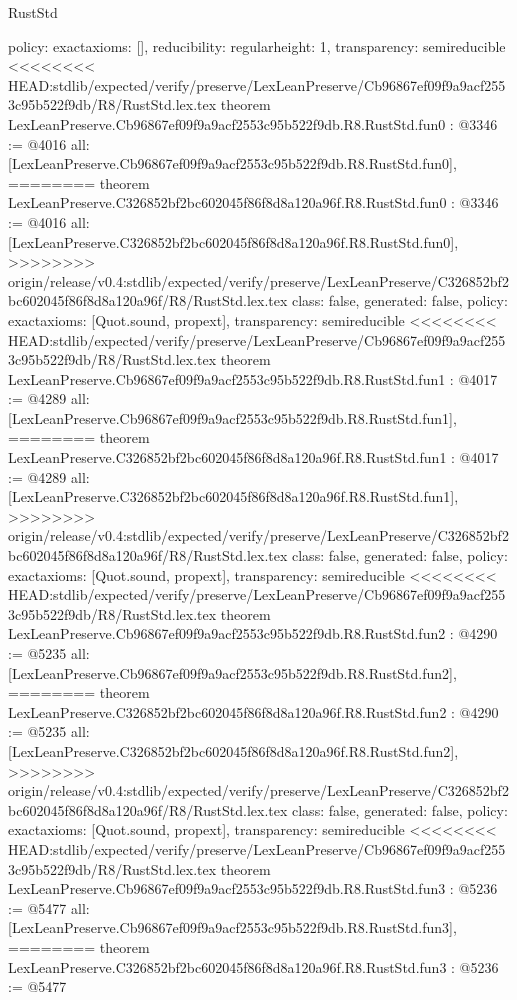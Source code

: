 \begin{lexlean}{RustStd}
\begin{coremodule}
{\begin{coremodule}
{{{  policy: exact{axioms: []},
  reducibility: regular{height: 1},
  transparency: semireducible
}
<<<<<<<< HEAD:stdlib/expected/verify/preserve/LexLeanPreserve/Cb96867ef09f9a9acf2553c95b522f9db/R8/RustStd.lex.tex
theorem LexLeanPreserve.Cb96867ef09f9a9acf2553c95b522f9db.R8.RustStd.fun0 : @3346 := @4016 {
  all: [LexLeanPreserve.Cb96867ef09f9a9acf2553c95b522f9db.R8.RustStd.fun0],
========
theorem LexLeanPreserve.C326852bf2bc602045f86f8d8a120a96f.R8.RustStd.fun0 : @3346 := @4016 {
  all: [LexLeanPreserve.C326852bf2bc602045f86f8d8a120a96f.R8.RustStd.fun0],
>>>>>>>> origin/release/v0.4:stdlib/expected/verify/preserve/LexLeanPreserve/C326852bf2bc602045f86f8d8a120a96f/R8/RustStd.lex.tex
  class: false,
  generated: false,
  policy: exact{axioms: [Quot.sound, propext]},
  transparency: semireducible
}
<<<<<<<< HEAD:stdlib/expected/verify/preserve/LexLeanPreserve/Cb96867ef09f9a9acf2553c95b522f9db/R8/RustStd.lex.tex
theorem LexLeanPreserve.Cb96867ef09f9a9acf2553c95b522f9db.R8.RustStd.fun1 : @4017 := @4289 {
  all: [LexLeanPreserve.Cb96867ef09f9a9acf2553c95b522f9db.R8.RustStd.fun1],
========
theorem LexLeanPreserve.C326852bf2bc602045f86f8d8a120a96f.R8.RustStd.fun1 : @4017 := @4289 {
  all: [LexLeanPreserve.C326852bf2bc602045f86f8d8a120a96f.R8.RustStd.fun1],
>>>>>>>> origin/release/v0.4:stdlib/expected/verify/preserve/LexLeanPreserve/C326852bf2bc602045f86f8d8a120a96f/R8/RustStd.lex.tex
  class: false,
  generated: false,
  policy: exact{axioms: [Quot.sound, propext]},
  transparency: semireducible
}
<<<<<<<< HEAD:stdlib/expected/verify/preserve/LexLeanPreserve/Cb96867ef09f9a9acf2553c95b522f9db/R8/RustStd.lex.tex
theorem LexLeanPreserve.Cb96867ef09f9a9acf2553c95b522f9db.R8.RustStd.fun2 : @4290 := @5235 {
  all: [LexLeanPreserve.Cb96867ef09f9a9acf2553c95b522f9db.R8.RustStd.fun2],
========
theorem LexLeanPreserve.C326852bf2bc602045f86f8d8a120a96f.R8.RustStd.fun2 : @4290 := @5235 {
  all: [LexLeanPreserve.C326852bf2bc602045f86f8d8a120a96f.R8.RustStd.fun2],
>>>>>>>> origin/release/v0.4:stdlib/expected/verify/preserve/LexLeanPreserve/C326852bf2bc602045f86f8d8a120a96f/R8/RustStd.lex.tex
  class: false,
  generated: false,
  policy: exact{axioms: [Quot.sound, propext]},
  transparency: semireducible
}
<<<<<<<< HEAD:stdlib/expected/verify/preserve/LexLeanPreserve/Cb96867ef09f9a9acf2553c95b522f9db/R8/RustStd.lex.tex
theorem LexLeanPreserve.Cb96867ef09f9a9acf2553c95b522f9db.R8.RustStd.fun3 : @5236 := @5477 {
  all: [LexLeanPreserve.Cb96867ef09f9a9acf2553c95b522f9db.R8.RustStd.fun3],
========
theorem LexLeanPreserve.C326852bf2bc602045f86f8d8a120a96f.R8.RustStd.fun3 : @5236 := @5477 {
}}}}}}}
\end{coremodule}}
\end{coremodule}
\end{lexlean}

